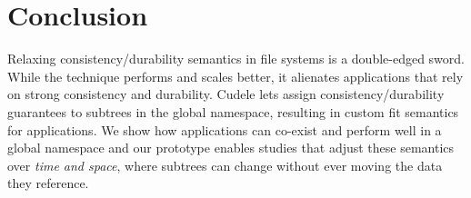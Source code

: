 %
%
%
%
%
%
%

\section{Conclusion}

Relaxing consistency/durability semantics in file systems is a double-edged
sword. While the technique performs and scales better, it alienates applications that rely
on strong consistency and durability.  Cudele lets
 assign consistency/durability
guarantees to subtrees in the global namespace, resulting in 
custom fit semantics for applications. We show how applications can co-exist and
perform well in a global namespace and our prototype enables studies that
adjust these semantics over {\it time and space}, where subtrees can change
without ever moving the data they reference.


